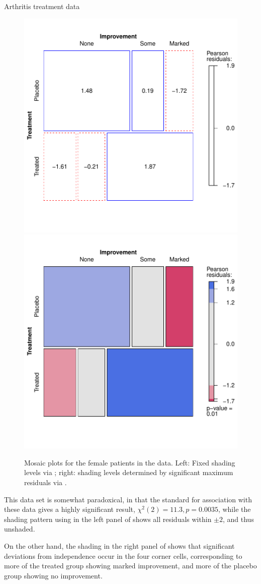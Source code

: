 \documentclass[11pt]{book}\usepackage[]{graphicx}\usepackage[]{color}
\newenvironment{knitrout}{}{} %
\renewenvironment{knitrout}{\small\renewcommand{\baselinestretch}{.85}}{} %
\begin{document}
\begin{Example}{Arthritis treatment data}
\begin{knitrout}
\begin{figure}[htbp]
\centerline{\includegraphics[width=.49\textwidth]{ch05/fig/arth-mosaic1} 
\includegraphics[width=.49\textwidth]{ch05/fig/arth-mosaic2} }

\caption[Mosaic plots for the female patients in the  data]{Mosaic plots for the female patients in the  data. Left: Fixed shading levels via ; right: shading levels determined by significant maximum residuals via .\label{fig:arth-mosaic}}
\end{figure}


\end{knitrout}

This data set is somewhat paradoxical, in that the standard  for
association with these data gives a highly significant result, 
$\chi^2 (2) = 11.3, p = 0.0035$, while the shading pattern using
 in the left panel of 
shows all residuals within $\pm 2$, and thus unshaded.

On the other hand, the  shading in the right panel of 
shows that significant deviations from independence occur in the four corner cells, corresponding
to more of the treated group showing marked improvement, and more of the placebo group showing
no improvement.  


\end{Example}
\end{document}
